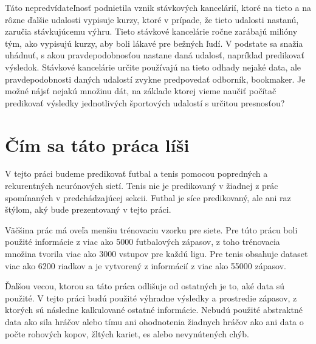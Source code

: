 Táto nepredvídateľnosť podnietila vznik stávkových kancelárií, ktoré na tieto a na rôzne ďalšie udalosti vypisuje kurzy, ktoré v prípade, že tieto udalosti nastanú, zaručia stávkujúcemu výhru.
Tieto stávkové kancelárie ročne zarábajú milióny tým, ako vypisujú kurzy, aby boli lákavé pre bežných ľudí.
V podstate sa snažia uhádnuť, s akou pravdepodobnosťou nastane daná udalosť, napríklad predikovať výsledok.
Stávkové kancelárie určite používajú na tieto odhady nejaké data, ale pravdepodobnosti daných udalostí zvykne predpovedať odborník, bookmaker.
Je možné nájsť nejakú množinu dát, na základe ktorej vieme naučiť počítač predikovať výsledky jednotlivých športových udalostí s určitou presnosťou?


\section*{Čím sa táto práca líši}
V tejto práci budeme predikovať futbal a tenis pomocou popredných a rekurentných neurónových sietí.
Tenis nie je predikovaný v žiadnej z prác spomínaných v predchádzajúcej sekcii.
Futbal je síce predikovaný, ale ani raz štýlom, aký bude prezentovaný v tejto práci.

Väčšina prác má oveľa menšiu trénovaciu vzorku pre siete. 
Pre túto prácu boli použité informácie z viac ako 5000 futbalových zápasov, z toho trénovacia množina tvorila viac ako 3000 vstupov pre každú ligu.
Pre tenis obsahuje dataset viac ako 6200 riadkov a je vytvorený z informácií z viac ako 55000 zápasov.

Ďalšou vecou, ktorou sa táto práca odlišuje od ostatných je to, aké data sú použité. V tejto práci budú použité výhradne výsledky a prostredie zápasov, z ktorých sú následne kalkulované ostatné informácie.
Nebudú použité abstraktné data ako sila hráčov alebo tímu ani ohodnotenia žiadnych hráčov ako ani data o počte rohových kopov, žltých kariet, es alebo nevynútených chýb.
